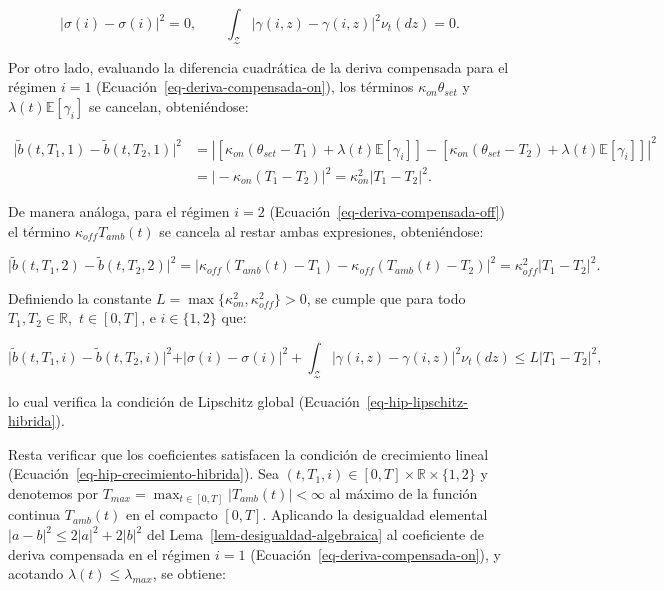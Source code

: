 \documentclass[
  spanish,
  letterpaper,
  DIV=11,
  numbers=noendperiod]{scrreprt}
\theoremstyle{plain}
\theoremstyle{plain}
\theoremstyle{plain}
\theoremstyle{definition}
\theoremstyle{remark}
\begin{document}
\[
\vert \sigma(i) - \sigma(i) \vert^2 = 0, \qquad \int_{\mathcal{Z}} \vert \gamma(i, z) - \gamma(i, z) \vert^2 \nu_t(dz) = 0.
\]

Por otro lado, evaluando la diferencia cuadrática de la deriva
compensada para el régimen \(i = 1\)
(Ecuación~\ref{eq-deriva-compensada-on}), los términos
\(\kappa_{on} \theta_{set}\) y \(\lambda(t)\mathbb{E}[\gamma_i]\) se
cancelan, obteniéndose:

\[
\begin{aligned}
\vert \tilde{b}(t, T_1, 1) - \tilde{b}(t, T_2, 1) \vert^2 &= \left\vert \left[ \kappa_{on}(\theta_{set} - T_1) + \lambda(t)\mathbb{E}[\gamma_i] \right] - \left[ \kappa_{on}(\theta_{set} - T_2) + \lambda(t)\mathbb{E}[\gamma_i] \right] \right\vert^2 \\
&= \vert -\kappa_{on}(T_1 - T_2) \vert^2 = \kappa_{on}^2 \vert T_1 - T_2 \vert^2.
\end{aligned}
\]

De manera análoga, para el régimen \(i = 2\)
(Ecuación~\ref{eq-deriva-compensada-off}) el término
\(\kappa_{off}T_{amb}(t)\) se cancela al restar ambas expresiones,
obteniéndose:

\[
\vert \tilde{b}(t, T_1, 2) - \tilde{b}(t, T_2, 2) \vert^2 = \left\vert \kappa_{off}(T_{amb}(t) - T_1) - \kappa_{off}(T_{amb}(t) - T_2) \right\vert^2 = \kappa_{off}^2 \vert T_1 - T_2 \vert^2.
\]

Definiendo la constante
\(L = \max\{\kappa_{on}^2, \kappa_{off}^2\} > 0\), se cumple que para
todo \(T_1, T_2 \in \mathbb{R},\) \(t \in [0, T]\), e \(i \in \{1, 2\}\)
que:

\[
\vert \tilde{b}(t, T_1, i) - \tilde{b}(t, T_2, i) \vert^2 + \vert \sigma(i) - \sigma(i) \vert^2 + \int_{\mathcal{Z}} \vert \gamma(i, z) - \gamma(i, z) \vert^2 \nu_t(dz) \le L \vert T_1 - T_2 \vert^2,
\]

lo cual verifica la condición de Lipschitz global
(Ecuación~\ref{eq-hip-lipschitz-hibrida}).

Resta verificar que los coeficientes satisfacen la condición de
crecimiento lineal (Ecuación~\ref{eq-hip-crecimiento-hibrida}). Sea
\((t, T_1, i) \in [0, T] \times \mathbb{R} \times \{1, 2\}\) y denotemos
por
\(\displaystyle T_{max} = \max_{t \in [0, T]} \vert T_{amb}(t) \vert < \infty\)
al máximo de la función continua \(T_{amb}(t)\) en el compacto
\([0, T]\). Aplicando la desigualdad elemental
\(\vert a - b \vert^2 \le 2\vert a \vert^2 + 2\vert b \vert^2\) del
Lema~\ref{lem-desigualdad-algebraica} al coeficiente de deriva
compensada en el régimen \(i = 1\)
(Ecuación~\ref{eq-deriva-compensada-on}), y acotando
\(\lambda(t) \le \lambda_{max}\), se obtiene:
\end{document}
